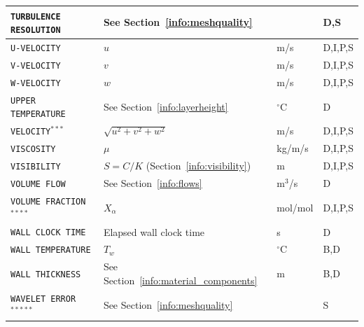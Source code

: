 \documentclass[11pt]{book}
\newcommand{\ct}{\tt\small}
\begin{document}
\begin{longtable}{@{\extracolsep{\fill}}|l|l|l|l|}
{\ct TURBULENCE RESOLUTION}                     & See Section~\ref{info:meshquality}            &                & D,S          \\ \hline
{\ct U-VELOCITY}                                & $u$                                           & m/s            & D,I,P,S      \\ \hline
{\ct V-VELOCITY}                                & $v$                                           & m/s            & D,I,P,S      \\ \hline
{\ct W-VELOCITY}                                & $w$                                           & m/s            & D,I,P,S      \\ \hline
{\ct UPPER TEMPERATURE}                         & See Section~\ref{info:layerheight}            & $^\circ$C      & D            \\ \hline
{\ct VELOCITY}$^{***}$                          & $\sqrt{u^2+v^2+w^2}$                          & m/s            & D,I,P,S      \\ \hline
{\ct VISCOSITY}                                 & $\mu$                                         & kg/m/s         & D,I,P,S      \\ \hline
{\ct VISIBILITY}                                & $S=C/K$ (Section~\ref{info:visibility})       & m              & D,I,P,S      \\ \hline
{\ct VOLUME FLOW}                               & See Section~\ref{info:flows}                  & m$^3$/s        & D            \\ \hline
{\ct VOLUME FRACTION}$^{****}$                  & $X_\alpha$                                    & mol/mol        & D,I,P,S      \\ \hline
{\ct WALL CLOCK TIME}                           & Elapsed wall clock time                       & s              & D            \\ \hline
{\ct WALL TEMPERATURE}                          & $T_w$                                         & $^\circ$C      & B,D          \\ \hline
{\ct WALL THICKNESS}                            & See Section~\ref{info:material_components}    & m              & B,D          \\ \hline
{\ct WAVELET ERROR}$^{*****}$                   & See Section~\ref{info:meshquality}            &                & S            \\ \hline
\end{longtable}
\end{document}
